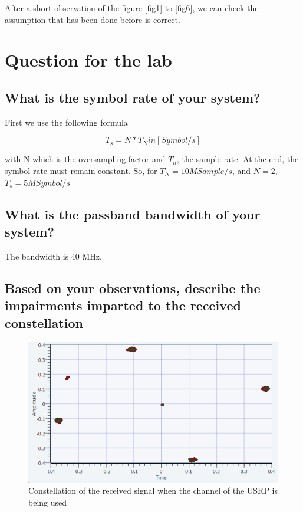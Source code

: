 \documentclass[frenchb, oneside, headings=normal]{scrartcl}
\begin{document}
After a short observation of the figure \ref{fig1} to \ref{fig6}, we can check the assumption that has been done before is correct. 


\newpage
\section{Question for the lab}

\subsection{What is the symbol rate of your system?}

First we use the following formula

\begin{equation}
T_s=N*T_N in [Symbol/s]
\end{equation}

with N which is the oversampling factor and $T_n$, the sample rate. At the end, the symbol rate must remain constant. So, for $T_N=10M Sample/s$, and $N=2$, \textbf{$T_s=5 MSymbol/s$}

\subsection{What is the passband bandwidth of your system?}

The bandwidth is 40 MHz.

\subsection{Based on your observations, describe the impairments imparted to the received constellation}

\begin{figure}[ht!]
\centering
\includegraphics[scale=0.9]{img/USRP-Rotate.png}
\caption{Constellation of the received signal when the channel of the USRP is being used}
\label{usrp}
\end{figure}
\end{document}
